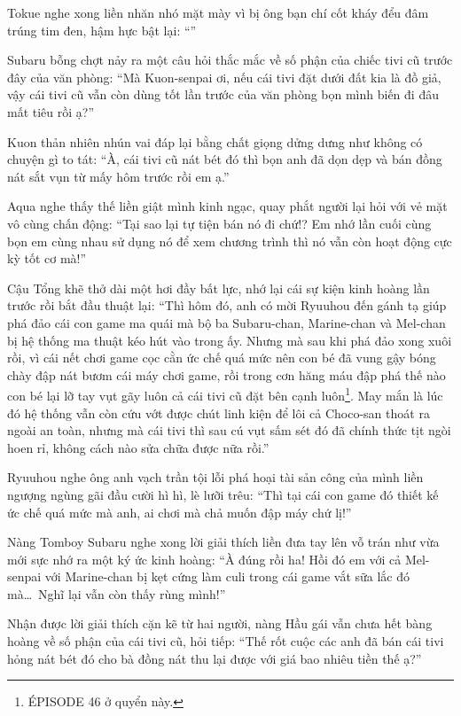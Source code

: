 \documentclass[../main.tex]{subfiles}
\begin{document}
Tokue nghe xong liền nhăn nhó mặt mày vì bị ông bạn chí cốt kháy đểu đâm trúng tim đen, hậm hực bật lại: ``''

Subaru bỗng chợt nảy ra một câu hỏi thắc mắc về số phận của chiếc tivi cũ trước đây của văn phòng: ``Mà Kuon-senpai ơi, nếu cái tivi đặt dưới đất kia là đồ giả, vậy cái tivi cũ vẫn còn dùng tốt lần trước của văn phòng bọn mình biến đi đâu mất tiêu rồi ạ?''

Kuon thản nhiên nhún vai đáp lại bằng chất giọng dửng dưng như không có chuyện gì to tát: ``À, cái tivi cũ nát bét đó thì bọn anh đã dọn dẹp và bán đồng nát sắt vụn từ mấy hôm trước rồi em ạ.''

Aqua nghe thấy thế liền giật mình kinh ngạc, quay phắt người lại hỏi với vẻ mặt vô cùng chấn động: ``Tại sao lại tự tiện bán nó đi chứ!? Em nhớ lần cuối cùng bọn em cùng nhau sử dụng nó để xem chương trình thì nó vẫn còn hoạt động cực kỳ tốt cơ mà!''

Cậu Tổng khẽ thở dài một hơi đầy bất lực, nhớ lại cái sự kiện kinh hoàng lần trước rồi bắt đầu thuật lại: ``Thì hôm đó, anh có mời Ryuuhou đến gánh tạ giúp phá đảo cái con game ma quái mà bộ ba Subaru-chan, Marine-chan và Mel-chan bị hệ thống ma thuật kéo hút vào trong ấy. Nhưng mà sau khi phá đảo xong xuôi rồi, vì cái nết chơi game cọc cằn ức chế quá mức nên con bé đã vung gậy bóng chày đập nát bươm cái máy chơi game, rồi trong cơn hăng máu đập phá thế nào con bé lại lỡ tay vụt gãy luôn cả cái tivi cũ đặt bên cạnh luôn\footnote{{\flaregothic ÉPISODE 46} ở quyển này.}. May mắn là lúc đó hệ thống vẫn còn cứu vớt được chút linh kiện để lôi cả Choco-san thoát ra ngoài an toàn, nhưng mà cái tivi thì sau cú vụt sấm sét đó đã chính thức tịt ngòi hoen rỉ, không cách nào sửa chữa được nữa rồi.''

Ryuuhou nghe ông anh vạch trần tội lỗi phá hoại tài sản công của mình liền ngượng ngùng gãi đầu cười hì hì, lè lưỡi trêu: ``Thì tại cái con game đó thiết kế ức chế quá mức mà anh, ai chơi mà chả muốn đập máy chứ lị!''

Nàng Tomboy Subaru nghe xong lời giải thích liền đưa tay lên vỗ trán như vừa mới sực nhớ ra một ký ức kinh hoàng: ``À đúng rồi ha! Hồi đó em với cả Mel-senpai với Marine-chan bị kẹt cứng làm culi trong cái game vắt sữa lắc đó mà\dots\ Nghĩ lại vẫn còn thấy rùng mình!''

Nhận được lời giải thích cặn kẽ từ hai người, nàng Hầu gái vẫn chưa hết bàng hoàng về số phận của cái tivi cũ, hỏi tiếp: ``Thế rốt cuộc các anh đã bán cái tivi hỏng nát bét đó cho bà đồng nát thu lại được với giá bao nhiêu tiền thế ạ?''
\end{document}
